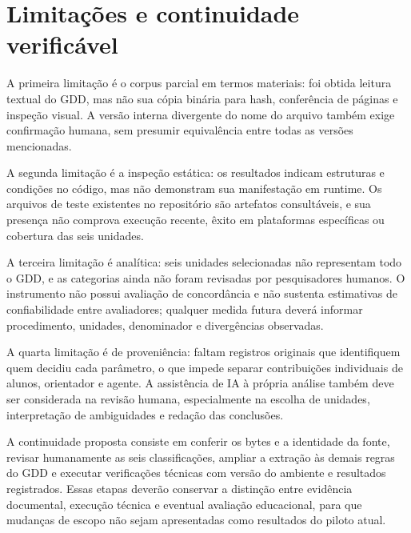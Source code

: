 \section{Limitações e continuidade verificável}
A primeira limitação é o corpus parcial em termos materiais: foi obtida leitura textual do GDD, mas não sua cópia binária para hash, conferência de páginas e inspeção visual. A versão interna divergente do nome do arquivo também exige confirmação humana, sem presumir equivalência entre todas as versões mencionadas.

A segunda limitação é a inspeção estática: os resultados indicam estruturas e condições no código, mas não demonstram sua manifestação em runtime. Os arquivos de teste existentes no repositório são artefatos consultáveis, e sua presença não comprova execução recente, êxito em plataformas específicas ou cobertura das seis unidades.

A terceira limitação é analítica: seis unidades selecionadas não representam todo o GDD, e as categorias ainda não foram revisadas por pesquisadores humanos. O instrumento não possui avaliação de concordância e não sustenta estimativas de confiabilidade entre avaliadores; qualquer medida futura deverá informar procedimento, unidades, denominador e divergências observadas.

A quarta limitação é de proveniência: faltam registros originais que identifiquem quem decidiu cada parâmetro, o que impede separar contribuições individuais de alunos, orientador e agente. A assistência de IA à própria análise também deve ser considerada na revisão humana, especialmente na escolha de unidades, interpretação de ambiguidades e redação das conclusões.

A continuidade proposta consiste em conferir os bytes e a identidade da fonte, revisar humanamente as seis classificações, ampliar a extração às demais regras do GDD e executar verificações técnicas com versão do ambiente e resultados registrados. Essas etapas deverão conservar a distinção entre evidência documental, execução técnica e eventual avaliação educacional, para que mudanças de escopo não sejam apresentadas como resultados do piloto atual.
